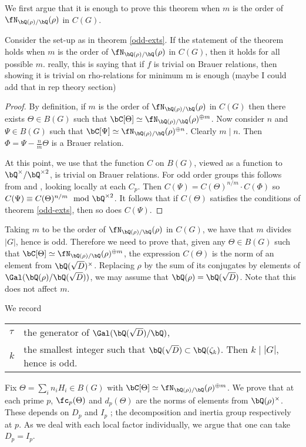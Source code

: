 We first argue that it is enough to prove this theorem when $m$ is the order of $\repnorm{\rho}$ in $C(G)$. 

\begin{lemma}
    Consider the set-up as in theorem \ref{odd-exts}. If the statement of the theorem holds when $m$ is the order of $\repnorm{\rho}$ in $C(G)$, then it holds for all possible $m$. {\color{red} really, this is saying that if $f$ is trivial on Brauer relations, then showing it is trivial on rho-relations for minimum m is enough (maybe I could add that in rep theory section)}
\end{lemma}

\begin{proof}
    By definition, if $m$ is the order of $\repnorm{\rho}$ in $C(G)$ then there exists $\Theta \in B(G)$ such that $\bC[\Theta] \simeq \repnorm{\rho}^{\oplus m}$.
    Now consider $n$ and $\Psi \in B(G)$ such that $\bC[\Psi] \simeq \repnorm{\rho}^{\oplus n}$. Clearly $m \mid n$.  Then $\Phi = \Psi - \frac{n}{m}\Theta$ is a Brauer relation.

    At this point, we use that the function $C$ on $B(G)$, viewed as a function to $\bQ^{\times} / \bQ^{\times 2}$, is trivial on Brauer relations. For odd order groups this follows from \cite[Theorem 2.47]{reg-const} and \cite[Theorem 3.2  (Tam)]{reg-const}, looking locally at each $C_p$. 
    Then $C(\Psi) = C(\Theta)^{n / m} \cdot C(\Phi)$ so $C(\Psi) \equiv C(\Theta)^{n / m} \mod \bQ^{\times 2}$. It follows that if $C(\Theta)$ satisfies the conditions of theorem \ref{odd-exts}, then so does $C(\Psi)$.
\end{proof}

Taking $m$ to be the order of $\repnorm{\rho}$ in $C(G)$, we have that $m$ divides $|G|$, hence is odd. Therefore we need to prove that, given any $
\Theta \in B(G)$ such that $\bC[\Theta] \simeq \repnorm{\rho}^{\oplus m}$, the expression $C(\Theta)$ is the norm of an element from $\bQ(\sqrt{D})^{\times}$.
Replacing $\rho$ by the sum of its conjugates by elements of $ \Gal(\bQ(\rho) / \bQ(\sqrt{D}))$, we may assume that $\bQ(\rho) = \bQ(\sqrt{D})$. Note that this does not affect $m$. 

We record
\begin{table}[H]
         \vspace{-1em}
         \setlength\itemsep{0em}
        \centering
\begin{tabular}{l l}
    $\tau$ & the generator of $\Gal(\bQ(\sqrt{D}) / \bQ)$, \\
    $k$ & the smallest integer such that $\bQ(\sqrt{D}) \subset \bQ(\zeta_k)$. Then $k \mid |G|$, hence is odd.
\end{tabular}
\vspace{-1em}
\end{table}
Fix $\Theta = \sum_i n_i H_i \in B(G)$ with $\bC[\Theta] \simeq \repnorm{\rho}^{\oplus m}$. We prove that at each prime $p$, $\fc_p(\Theta)$ and $d_p(\Theta)$ are the norms of elements from $\bQ(\rho)^{\times}$.  These depends on $D_p$ and $I_p$ ; the decomposition and inertia group respectively at $p$. As we deal with each local factor individually, we argue that one can take $D_p = I_p$.

